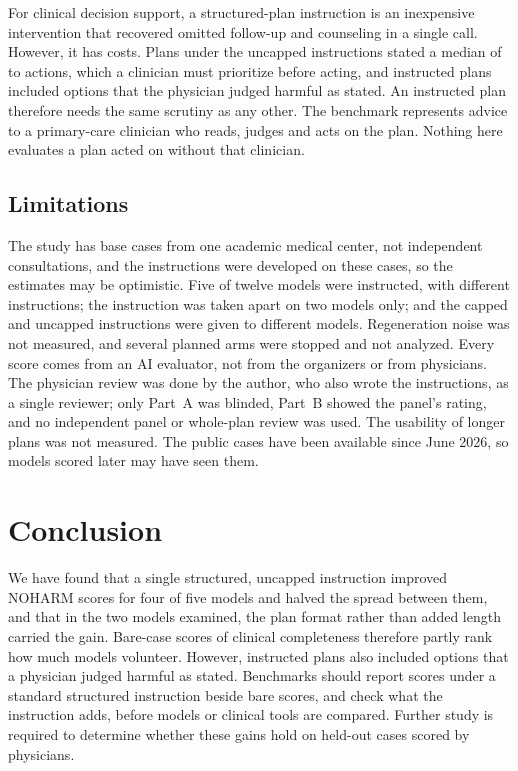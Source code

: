 \documentclass[11pt]{article}
\begin{document}
For clinical decision support, a structured-plan instruction is an inexpensive intervention that
recovered omitted follow-up and counseling in a single call. However, it has costs. Plans under the
uncapped instructions stated a median of \covATerraSpec{} to \covASonnetSpec{} actions, which a
clinician must prioritize before acting, and instructed plans included options that the physician judged
harmful as stated. An instructed plan therefore needs the same scrutiny as any other. The benchmark represents advice to a primary-care clinician who reads,
judges and acts on the plan. Nothing here evaluates a plan acted on without that clinician.

\subsection*{Limitations}
\label{sec:limitations}
The study has \nCases{} base cases from one academic medical center, not \nItems{} independent
consultations, and the instructions were developed on these cases, so the estimates may be
optimistic. Five of twelve models were instructed, with different instructions; the instruction was
taken apart on two models only; and the capped and uncapped instructions were given to different
models. Regeneration noise was not measured, and several planned arms were stopped and not analyzed.
Every score comes from an AI evaluator, not from the organizers or from physicians. The physician
review was done by the author, who also wrote the instructions, as a single reviewer; only Part~A
was blinded, Part~B showed the panel's rating, and no independent panel or whole-plan review was
used.
The usability of longer plans was not measured. The public cases have been available since June
2026, so models scored later may have seen them.

\section*{Conclusion}
\label{sec:conclusion}
We have found that a single structured, uncapped instruction improved NOHARM scores for four of five
models and halved the spread between them, and that in the two models examined, the plan format
rather than added length carried the gain. Bare-case scores of clinical completeness therefore
partly rank how much models volunteer. However, instructed plans also included options that a physician
judged harmful as stated. Benchmarks should report scores under a standard structured instruction beside
bare scores, and check what the instruction adds, before models or clinical tools are compared. Further study is
required to determine whether these gains hold on held-out cases scored by physicians.
\end{document}
